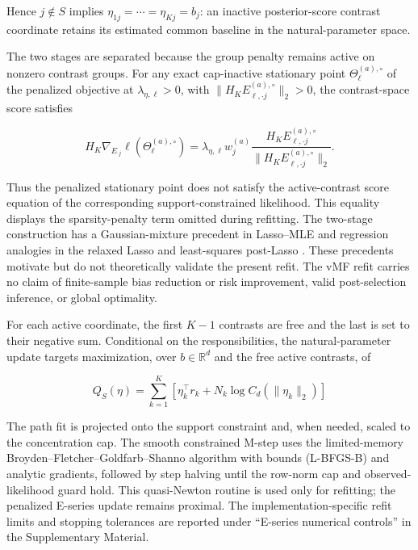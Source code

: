 \documentclass[preprint,12pt,authoryear]{elsarticle}
\newcounter{algorithm}
\begin{document}
Hence $j\notin S$ implies
$\eta_{1j}=\cdots=\eta_{Kj}=b_j$: an inactive posterior-score contrast coordinate
retains its estimated common baseline in the natural-parameter space.

The two stages are separated because the group penalty remains active on
nonzero contrast groups. For any exact cap-inactive stationary point
$\Theta_{\ell}^{(a),\circ}$ of the penalized objective at
$\lambda_{\eta,\ell}>0$, with
$\lVert H_KE_{\ell,\cdot j}^{(a),\circ}\rVert_2>0$, the contrast-space score
satisfies

\begin{equation}
\label{eq:active-penalized-score}
H_K\nabla_{E_{\cdot j}}\ell
\left(\Theta_{\ell}^{(a),\circ}\right)
=\lambda_{\eta,\ell}w_j^{(a)}
\frac{H_KE_{\ell,\cdot j}^{(a),\circ}}
{\lVert H_KE_{\ell,\cdot j}^{(a),\circ}\rVert_2}.
\end{equation}

Thus the penalized stationary point does not satisfy the active-contrast score
equation of the corresponding support-constrained likelihood. This equality
displays the sparsity-penalty term omitted during refitting. The two-stage
construction has a Gaussian-mixture precedent in Lasso--MLE
\citep{meynet2012thesis,meynet2012sparse} and regression analogies in the
relaxed Lasso and least-squares post-Lasso
\citep{meinshausen2007relaxed,belloni2013postlasso}. These precedents motivate
but do not theoretically validate the present refit. The vMF refit carries no
claim of finite-sample bias reduction or risk improvement, valid post-selection
inference, or global optimality.

For each active coordinate, the first $K-1$ contrasts are free and the last is
set to their negative sum. Conditional on the responsibilities, the
natural-parameter update targets maximization, over $b\in\mathbb R^d$ and the
free active contrasts, of

\begin{equation}
\label{eq:refit-q}
Q_S(\eta)
=\sum_{k=1}^K
\left[
\eta_k^\top r_k
+N_k\log C_d(\lVert\eta_k\rVert_2)
\right]
\end{equation}

The path fit is projected onto the support constraint and, when needed, scaled
to the concentration cap. The smooth constrained M-step uses the
limited-memory Broyden--Fletcher--Goldfarb--Shanno algorithm with bounds
(L-BFGS-B) \citep{byrd1995lbfgsb} and analytic gradients, followed by step
halving until the row-norm cap and observed-likelihood guard hold. This
quasi-Newton routine is used only for refitting; the penalized E-series update
remains proximal. The implementation-specific refit limits and stopping
tolerances are reported under ``E-series numerical controls'' in the
Supplementary Material.
\end{document}
